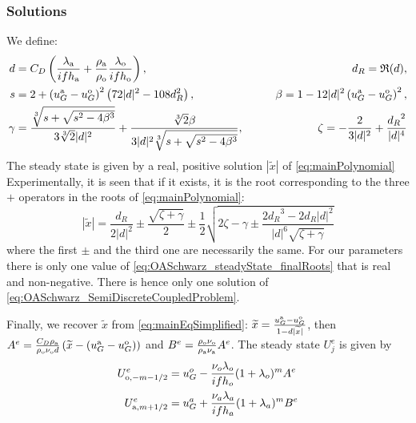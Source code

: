 \subsubsection{Solutions}
\label{sec:summary_stationnary}
We define:
\begin{equation}
    \begin{aligned}
    {d} &= C_D\left(
    \frac{\lambda_{\rm a}}{if h_{\rm a}} 
    +\frac{\rho_{\rm a}}{\rho_{\rm o}}\frac{\lambda_{\rm o}}{if h_{\rm o}} \right), \qquad &d_R = \mathfrak{R}(d),
    \\
    s &= 2 + \left(u_G^{\rm a} - u_G^{\rm o}\right)^2 \left(72 |d|^2 - 108 d_R^2 \right),
    \qquad
    &\beta = 1 - 12 |d|^2 \left(u_G^{\rm a} - u_G^{\rm o}\right)^2, \\
    \gamma &= \frac{\sqrt[3]{s+\sqrt{s^2 - 4 \beta^3}}}{3\sqrt[3]{2}|d|^2} +\frac{\sqrt[3]{2}\beta}{3|d|^2 \sqrt[3]{s+\sqrt{s^2 - 4 \beta^3}}}, 
    \qquad &\zeta = -\frac{2}{3|d|^2} + \frac{{d_R}^2}{|d|^4}
    \end{aligned}
\end{equation}
The steady state is given by a real, positive solution $|\widetilde{x}|$ of \eqref{eq:mainPolynomial}
Experimentally, it is seen that if it exists, it is the root corresponding to the three $+$ operators in the roots of \eqref{eq:mainPolynomial}:
\begin{equation}
	\label{eq:OASchwarz_steadyState_finalRoots}
    |\widetilde{x}| = \frac{{d_R}}{2|d|^2} \pm \frac{\sqrt{\zeta + \gamma }}{2} \pm \frac{1}{2}
    \sqrt{
    2\zeta - 
    \gamma
    \pm
    \frac{2{d_R}^3 - 2{d_R}|d|^2}{|d|^6 \sqrt{\zeta + \gamma }}
    }
\end{equation}
where the first $\pm$ and the
third one are necessarily the same.
For our parameters there is only one
value of \eqref{eq:OASchwarz_steadyState_finalRoots} that
is real and non-negative. There is hence only one solution of
\eqref{eq:OASchwarz_SemiDiscreteCoupledProblem}.
\par
Finally, we recover $\widetilde{x}$ from \eqref{eq:mainEqSimplified}: $\widetilde{x} = \frac{u_G^{\rm a} - u_G^{\rm o}}{1 - d |\widetilde{x}|}$, then $A^e = \frac{C_D \rho_{\rm a}}{\rho_{\rm o} \nu_{\rm o} d}\left(\widetilde{x} - (u_G^{\rm a} - u_G^{\rm o})\right)$ 
and
$ B^e = \frac{\rho_{\rm o} \nu_{\rm o}}{\rho_{\rm a} \nu_{\rm a}}A^e$.
The steady state $U^e_j$ is given by
\begin{equation}
	\begin{aligned}
	U^e_{{\rm o}, -m-1/2} &=
		u_G^o - \frac{\nu_o\lambda_o}{if h_o}
		(1+\lambda_o)^{m} A^e\\
	U^e_{{\rm a}, m+1/2} &= 
u_G^a + \frac{\nu_a\lambda_a}{if h_a}
		(1+\lambda_a)^{m} B^e
	\end{aligned}
\end{equation}
